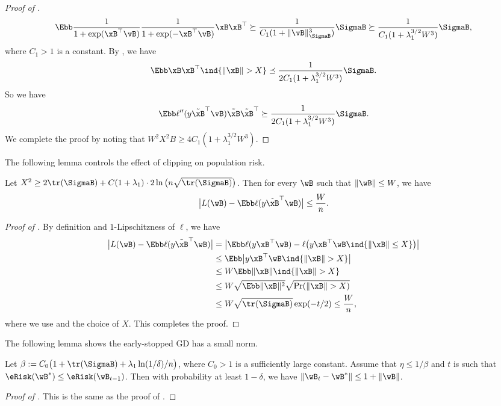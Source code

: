 \documentclass[11pt]{article}
\begin{document}
\begin{proof}[Proof of ]
\begin{align*}
    \Ebb \frac{1}{1+\exp(\xB^\top \vB)} \frac{1}{1+\exp(-\xB^\top \vB)} \xB \xB^\top 
    \succeq \frac{1}{C_1(1+\|\vB\|^3_{\SigmaB})} \SigmaB
    \succeq \frac{1}{C_1(1+\lambda_1^{3/2} W^3)} \SigmaB,
\end{align*}
where $C_1>1$ is a constant.
By , we have 
\begin{align*}
    \Ebb \xB \xB^\top\ind{\|\xB\|> X} \preceq \frac{1}{2C_1(1+\lambda_1^{3/2} W^3)} \SigmaB.
\end{align*}
So we have 
\begin{align*}
    \Ebb \ell''(y \tilde\xB^\top \vB)  \tilde\xB \tilde\xB^\top \succeq \frac{1}{2C_1(1+\lambda_1^{3/2} W^3)} \SigmaB.
\end{align*}
We complete the proof by noting that $W^2 X^2 B \ge 4C_1(1+\lambda_1^{3/2} W^3)$.
\end{proof}




The following lemma controls the effect of clipping on population risk.
\begin{lemma}\label{lemma:loss-small-prob}
Let $X^2 \ge  2\tr(\SigmaB) + C(1+\lambda_1)\cdot 2 \ln\big(n \sqrt{\tr(\SigmaB)}  \big)$.
Then for every $\wB$ such that $\|\wB\|\le W$, we have
\begin{align*}
   \big| L(\wB) - \Ebb \ell(y \tilde\xB^\top \wB) \big|\le  \frac{W}{n}.
\end{align*}
\end{lemma}
\begin{proof}[Proof of ]
By definition and $1$-Lipschitzness of $\ell$, we have 
\begin{align*}
\big| L(\wB) - \Ebb \ell(y \tilde\xB^\top \wB) \big|
&= \big| \Ebb\ell(y \xB^\top \wB) - \ell \big(y \xB^\top \wB \ind{\|\xB\|\le X}\big)  \big|\\
&\le \Ebb\big| y \xB^\top \wB\ind{\|\xB\|> X} \big|\\
&\le W \Ebb  \|\xB\|\ind{\|\xB\|> X} \\
    &\le  W\sqrt{\Ebb \|\xB\|^2} \sqrt{\Pr(\|\xB\|>X)} \\
    &\le  W\sqrt{\tr(\SigmaB)}\exp(-t/2)
    \le \frac{W}{n},
\end{align*}
where we use  and the choice of $X$.
This completes the proof.
\end{proof}

The following lemma shows the early-stopped GD has a small norm.
\begin{lemma}\label{lemma:fast-norm-bound}
Let  
\(\beta:= C_0 \big( 1+ \tr(\SigmaB) + \lambda_1 \ln(1/\delta)/n \big)\),
where $C_0>1$ is a sufficiently large constant.
Assume that $\eta \le 1/\beta$ and $t$ is such that $\eRisk(\wB^*)\le \eRisk(\wB_{t-1})$.
Then with probability at least $1-\delta$, we have $\|\wB_t-\wB^*\|\le 1+\|\wB\| $.
\end{lemma}
\begin{proof}[Proof of ]
This is the same as the proof of .
\end{proof}
\end{document}
